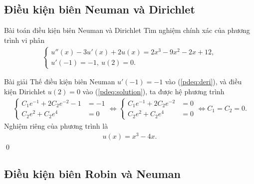 \documentclass[9pt]{beamer}
\numberwithin{equation}{section}
\begin{document}
\subsection{Điều kiện biên Neuman và Dirichlet}

\begin{frame}
\begin{block}{Bài toán điều kiện biên Neuman và Dirichlet}
    Tìm nghiệm chính xác của phương trình vi phân
    \begin{align*}
        \begin{cases}
        u''(x) - 3u'(x) + 2u(x) = 2x^3 - 9x^2 - 2x + 12, \\
        u'(-1) = -1, \ u(2) = 0.
        \end{cases}
    \end{align*}
\end{block}
\begin{exampleblock}{Bài giải}
    Thế điều kiện biên Neuman $u'(-1) = -1$ vào (\ref{pdeq:deri}), và điều kiện Dirichlet $u(2) = 0$ vào (\ref{pdeq:solution}), ta được hệ phương trình
    \begin{align*}
        \begin{cases}
        C_1 e^{-1} + 2C_2 e^{-2} - 1 &= -1 \\
        C_2 e^2 + C_2 e^4 &= 0
        \end{cases} \Leftrightarrow
        \begin{cases}
        C_1 e^{-1} + 2C_2 e^{-2} &= 0 \\
        C_2 e^2 + C_2 e^4 &= 0
        \end{cases} \Leftrightarrow
        C_1 = C_2 = 0.
    \end{align*}
    Nghiệm riêng của phương trình là
    \begin{align*}
        u(x) = x^3 - 4x.
    \end{align*} \hfill \qed
\end{exampleblock}
\end{frame}

\subsection{Điều kiện biên Robin và Neuman}
\end{document}
